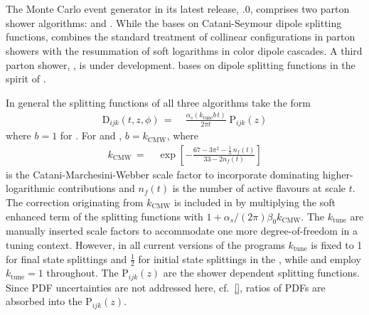 \section{\Sherpa}
\label{sec:psunc:tools:sherpa}

The \Sherpa Monte Carlo event generator \cite{Gleisberg:2008ta} in its latest
release, .0, comprises two parton shower algorithms: \CSS
\cite{Schumann:2007mg} and \Dire \cite{Hoche:2015sya}. While the \CSS bases on
Catani-Seymour \cite{Catani:1996vz,Catani:2002hc} dipole splitting functions,
\Dire combines the standard treatment of collinear configurations in parton
showers with the resummation of soft logarithms in color dipole cascades. A
third parton shower, \Ants \cite{ants}, is under development. \Ants bases on
dipole splitting functions in the spirit of
\cite{Winter:2007ye,Lonnblad:1992tz}.

In general the splitting functions of all three algorithms take the 
form 
\begin{equation}
  \begin{split}\label{eq:psunc:tools:sherpa:sf}
    \mathrm{D}_{ijk}(t,z,\phi)
    \,=\;& \frac{\alpha_s(k_\text{tune}b\,t)}{2\pi t}\;\mathrm{P}_{ijk}(z)
  \end{split}
\end{equation}
where $b=1$ for \Dire. For \CSS and \Ants, $b=k_\text{CMW}$, where
\begin{equation}
  \begin{split}\label{eq:psunc:tools:sherpa:kcmw}
    k_\text{CMW}
    \,=\;&\exp\left[-\frac{67-3\pi^2-\tfrac{1}{3}\,n_f(t)}{33-2n_f(t)}\right]
  \end{split}
\end{equation}
is the Catani-Marchesini-Webber scale factor \cite{Catani:1990rr}
to incorporate dominating higher-logarithmic contributions and $n_f(t)$ 
is the number of active flavours at scale $t$. The correction originating from
$k_\text{CMW}$ is included in \Dire by multiplying the soft enhanced term of the
splitting functions with $1+\alpha_s/(2\pi)\beta_0k_\text{CMW}$. The $k_\text{tune}$ 
are manually inserted scale factors to accommodate one more degree-of-freedom 
in a tuning context. However, in all current versions of the programs 
$k_\text{tune}$ is fixed to 1 for final state splittings and $\tfrac{1}{2}$ 
for initial state splittings in the \CSS, while \Ants and \Dire employ 
$k_\text{tune}=1$ throughout. The $\mathrm{P}_{ijk}(z)$ are the shower 
dependent splitting functions. 
Since PDF uncertainties are not addressed here, cf.\ \ref{}, ratios of 
PDFs are absorbed into the $\mathrm{P}_{ijk}(z)$.

